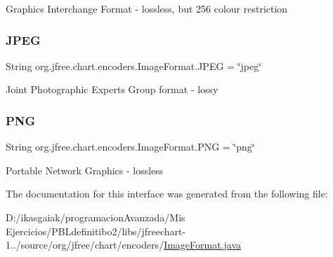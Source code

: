 Graphics Interchange Format -\/ lossless, but 256 colour restriction \mbox{\label{interfaceorg_1_1jfree_1_1chart_1_1encoders_1_1_image_format_add5d4321a9d0e25fa24cfb8c84fe67eb}} 
\subsubsection{\texorpdfstring{J\+P\+EG}{JPEG}}
{\footnotesize\ttfamily String org.\+jfree.\+chart.\+encoders.\+Image\+Format.\+J\+P\+EG = \char`\"{}jpeg\char`\"{}\hspace{0.3cm}{\ttfamily [static]}}

Joint Photographic Experts Group format -\/ lossy \mbox{\label{interfaceorg_1_1jfree_1_1chart_1_1encoders_1_1_image_format_ab5d0502b4c352b4aaea670ca202c9bf7}} 
\subsubsection{\texorpdfstring{P\+NG}{PNG}}
{\footnotesize\ttfamily String org.\+jfree.\+chart.\+encoders.\+Image\+Format.\+P\+NG = \char`\"{}png\char`\"{}\hspace{0.3cm}{\ttfamily [static]}}

Portable Network Graphics -\/ lossless 

The documentation for this interface was generated from the following file\+:\begin{DoxyCompactItemize}
\item 
D\+:/ikasgaiak/programacion\+Avanzada/\+Mis Ejercicios/\+P\+B\+Ldefinitibo2/libs/jfreechart-\/1../source/org/jfree/chart/encoders/\mbox{\hyperlink{_image_format_8java}{Image\+Format.\+java}}\end{DoxyCompactItemize}
